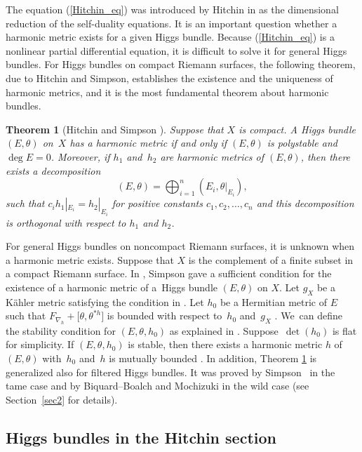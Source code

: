 \documentclass[10pt,a4paper]{amsart}
\numberwithin{equation}{section}
\newtheorem{Theorem}{Theorem}[section]
\begin{document}
The equation (\ref{Hitchin_eq}) was introduced by Hitchin in \cite{Hi1} as the dimensional reduction of the self-duality equations. It is an important question whether a harmonic metric exists for a given Higgs bundle. Because (\ref{Hitchin_eq}) is a nonlinear partial differential equation, it is difficult to solve it for general Higgs bundles. For Higgs bundles on compact Riemann surfaces, the following theorem, due to Hitchin and Simpson, establishes the existence and the uniqueness of harmonic metrics, and it is the most fundamental theorem about harmonic bundles.
\begin{Theorem}[Hitchin \cite{Hi1} and Simpson \cite{Si1}]\label{Hitchin_thm1}
 Suppose that $X$ is compact. A Higgs bundle $(E,\theta)$ on~$X$ has a harmonic metric if and only if $(E,\theta)$ is polystable and $\deg{E}=0$. Moreover, if $h_1$ and~$h_2$ are harmonic metrics of $(E,\theta)$, then there exists a decomposition
 \begin{equation*}
 (E,\theta) = \bigoplus_{i=1}^{n} (E_i,\theta|_{E_i}),
 \end{equation*}
 such that $c_i h_1|_{E_i} = h_2|_{E_i}$ for positive constants $c_1,c_2,\ldots,c_n$ and this decomposition is orthogonal with respect to $h_1$ and $h_2$.
\end{Theorem}

For general Higgs bundles on noncompact Riemann surfaces, it is unknown when a harmonic metric exists.
Suppose that $X$ is the complement of a finite subset in a compact Riemann surface. In \cite{Si1}, Simpson gave a sufficient condition for the existence of a harmonic metric of a~Higgs bundle $(E,\theta)$ on $X$. Let $g_X$ be a K\"{a}hler metric satisfying the condition in \cite[Proposition~2.4]{Si1}. Let $h_0$ be a Hermitian metric of $E$ such that $F_{\nabla_{h}} + \bigl[\theta, \theta^{\ast h}\bigr]$ is bounded with respect to~$h_0$ and~$g_X$ . We~can define the stability condition for $(E,\theta, h_0)$ as explained in \cite[Section 3]{Si1}. Suppose~$\det(h_0)$ is flat for simplicity. If $(E,\theta, h_0)$ is stable, then there exists a harmonic metric $h$ of $(E,\theta)$ with~$h_0$ and~$h$ is mutually bounded \cite[Theorem 1]{Si1}. In addition, Theorem \ref{Hitchin_thm1} is generalized also for filtered Higgs bundles. It was proved by Simpson~\cite{Si2} in the tame case and by Biquard--Boalch \cite{BB} and Mochizuki \cite{Mo1} in the wild case (see Section~\ref{sec2} for details).

\subsection{Higgs bundles in the Hitchin section}
\end{document}
